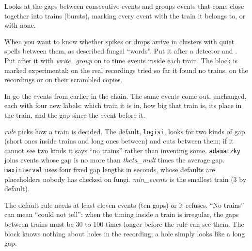 Looks at the gaps between consecutive events and groups events that come close together into
trains (bursts), marking every event with the train it belongs to, or with none.

When you want to know whether spikes or drops arrive in clusters with quiet spells between
them, as \citet{adamatzky2022language} described fungal ``words''. Put it after a detector
and . Put  after it
with \emph{write\_group} on to time events inside each train. The block is marked
experimental: on the real recordings tried so far it found no trains, on the recordings or on
their scrambled copies.

In go the events from earlier in the chain. The same events come out, unchanged, each with
four new labels: which train it is in, how big that train is, its place in the train, and the
gap since the event before it.

\emph{rule} picks how a train is decided. The default, \texttt{logisi}, looks for two kinds
of gap (short ones inside trains and long ones between) and cuts between them; if it cannot
see two kinds it says ``no trains'' rather than inventing some. \texttt{adamatzky} joins
events whose gap is no more than \emph{theta\_mult} times the average gap.
\texttt{maxinterval} uses four fixed gap lengths in seconds, whose defaults are placeholders
nobody has checked on fungi. \emph{min\_events} is the smallest train (3 by default).

The default rule needs at least eleven events (ten gaps) or it refuses. ``No trains'' can
mean ``could not tell'': when the timing inside a train is irregular, the gaps between trains
must be 30 to 100 times longer before the rule can see them. The block knows nothing about
holes in the recording; a hole simply looks like a long gap.
